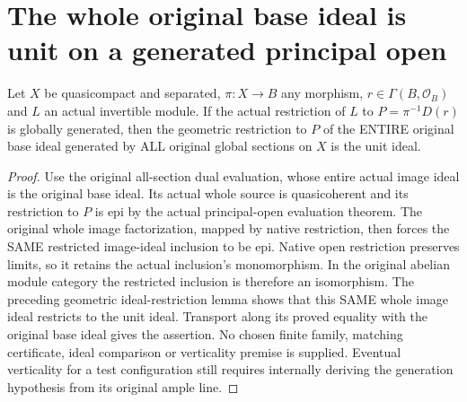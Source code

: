 \section{The whole original base ideal is unit on a generated principal open}

\begin{proposition}
\label{prop:principal-open-base-ideal-unit}
\leanok
{}
Let $X$ be quasicompact and separated, $\pi:X\to B$ any morphism,
$r\in\Gamma(B,\mathcal O_B)$ and $L$ an actual invertible module.
If the actual restriction of $L$ to $P=\pi^{-1}D(r)$ is globally
generated, then the geometric restriction to $P$ of the ENTIRE
original base ideal generated by ALL original global sections
on $X$ is the unit ideal.
\end{proposition}
\begin{proof}
Use the original all-section dual evaluation, whose entire
actual image ideal is the original base ideal. Its actual
whole source is quasicoherent and its restriction to $P$ is
epi by the actual principal-open evaluation theorem. The
original whole image factorization, mapped by native restriction,
then forces the SAME restricted image-ideal inclusion to be epi.
Native open restriction preserves limits, so it retains the
actual inclusion's monomorphism. In the original abelian module
category the restricted inclusion is therefore an isomorphism.
The preceding geometric ideal-restriction lemma shows that this
SAME whole image ideal restricts to the unit ideal. Transport
along its proved equality with the original base ideal gives
the assertion. No chosen finite family, matching certificate,
ideal comparison or verticality premise is supplied. Eventual
verticality for a test configuration still requires internally
deriving the generation hypothesis from its original ample line.
\end{proof}
